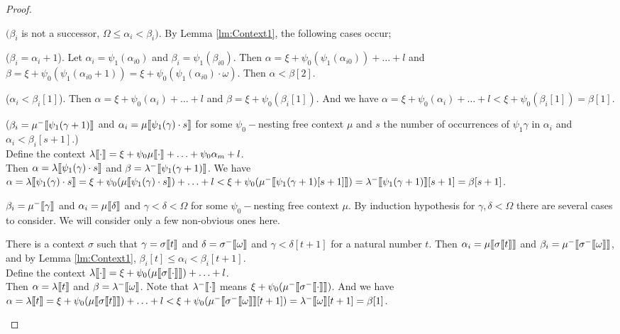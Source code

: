 \documentclass{amsart}
\theoremstyle{plain}
\theoremstyle{plain}
\def\scbrl{[\hspace{-.14em}[}
\def\scbrr{]\hspace{-.14em}]}
\def\scbr#1{\scbrl#1\scbrr}
\newcommand{\Om}{{\Omega}}
\newcommand{\al}{{\alpha}}
\newcommand{\be}{{\beta}}
\newcommand{\ga}{\gamma}
\newcommand{\de}{\delta}
\newcommand{\la}{\lambda}
\newcommand{\om}{\omega}
\def\scbrl{[\hspace{-.14em}[}
\def\scbrr{]\hspace{-.14em}]}
\def\scbr#1{\scbrl#1\scbrr}
\begin{document}
\begin{proof}
\begin{Cases}
\begin{Cases}
    \end{Cases}
    
    \item $(\be_i$ is not a successor, $\Om \leq \al_i<\be_i)$.
    By Lemma \ref{lm:Context1}, the following cases occur;
    \begin{Cases}
        \item ($\be_i =\al_i+1$). Let $\al_i=\psi_1(\al_{i0})$ and $\be_i=\psi_1(\be_{i0})$.
        Then $\al = \xi + \psi_0(\psi_1(\al_{i0}))+\ldots+l$ and $\be=\xi + \psi_0(\psi_1(\al_{i0}+1)) =\xi + \psi_0(\psi_1(\al_{i0})\cdot \om)$.
        Then $\al< \be[2]$.\medskip
        
        
        \item ($\al_i<\be_i[1]$). 
        Then $\al = \xi + \psi_0(\al_i)+\ldots +l$ and $\be = \xi + \psi_0(\be_i[1])$.
        And we have $\al = \xi + \psi_0(\al_i)+\ldots +l <\xi + \psi_0(\be_i[1]) =\be[1]$.\medskip
        
        
        \item ($\be_i= \mu^-\scbr{\psi_1(\ga+1)}$ and $\al_i=\mu\scbr{\psi_1(\ga)\cdot s}$  for some  $\psi_0-$nesting free context $\mu$ and $s$  the number of occurrences of $\psi_1\ga$ in $\al_i$ and $\al_i<\be_i[s+1]$.)\\
        Define the context 
        $\la\scbr{\cdot} = \xi + \psi_0\mu\scbr{\cdot}+ \ldots+ \psi_0{\al_m} +l$. 
        \\Then $\al=\la\scbr{\psi_1(\ga)\cdot s}$ and $\be= \la^-\scbr{\psi_1(\ga+1)}$.
        We have $\al = \la\scbr{\psi_1(\ga)\cdot s} = \xi + \psi_0(\mu\scbr{\psi_1(\ga)\cdot s})+ \ldots+l
        < \xi + \psi_0(\mu^-\scbr{\psi_1(\ga+1)[s+1]}) =\la^-\scbr{\psi_1(\ga+1)}[s+1] =\be[s+1]$.\medskip

        
        \item $\be_i= \mu^-\scbr{\ga}$ and $\al_i=\mu\scbr{\de}$ and $\ga<\de<\Om$ for some $\psi_0-$nesting free context $\mu$.
        By induction hypothesis for $\ga,\de<\Om$ there are several cases to consider. We will consider only a few non-obvious ones here.\medskip
        \begin{Cases}
            \item There is a context $\sigma$ such that $\ga= \sigma\scbr{t}$ and $\de=\sigma^-\scbr{\om}$ and $\ga<\de[t+1]$ for a natural number $t$.
            Then $\al_i= \mu\scbr{\sigma\scbr{t}}$ and $\be_i= \mu^-\scbr{\sigma^-\scbr{\om}}$, and by Lemma \ref{lm:Context1}, $\be_i[t] \leq \al_i<\be_i[t+1]$.
            \\
            Define the context 
            $\la\scbr{\cdot} = \xi+ \psi_0(\mu\scbr{\sigma\scbr{\cdot}})+\ldots+l$.\\
            Then  $\al = \la\scbr{t}$ and $\be = \la^-\scbr{\om}$. Note that $\la^-\scbr{\cdot}$ means $\xi+\psi_0(\mu^-\scbr{\sigma^-\scbr{\cdot}})$.
            And we have 
            $\al= \la\scbr{t} = \xi+ \psi_0(\mu\scbr{\sigma\scbr{t}})+\ldots+l < \xi+\psi_0(\mu^-\scbr{\sigma^-\scbr{\om}}[t+1])
            = \la^-\scbr{\om}[t+1] = \be[1]$.\medskip
        \end{Cases}
        

\end{Cases}
\end{Cases}
\end{proof}
\end{document}
